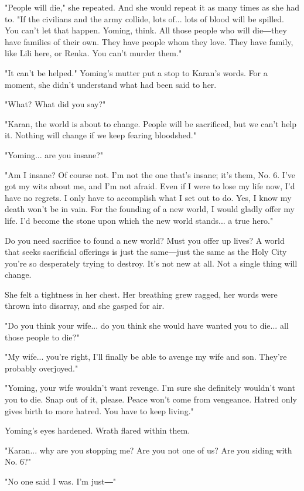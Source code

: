 "People will die," she repeated. And she would repeat it as many times
as she had to. "If the civilians and the army collide, lots of... lots
of blood will be spilled. You can't let that happen. Yoming, think. All
those people who will die―they have families of their own. They have
people whom they love. They have family, like Lili here, or Renka. You
can't murder them."

"It can't be helped." Yoming's mutter put a stop to Karan's words. For a
moment, she didn't understand what had been said to her.

"What? What did you say?"

"Karan, the world is about to change. People will be sacrificed, but we
can't help it. Nothing will change if we keep fearing bloodshed."

"Yoming... are you insane?"

"Am I insane? Of course not. I'm not the one that's insane; it's them,
No. 6. I've got my wits about me, and I'm not afraid. Even if I were to
lose my life now, I'd have no regrets. I only have to accomplish what I
set out to do. Yes, I know my death won't be in vain. For the founding
of a new world, I would gladly offer my life. I'd become the stone upon
which the new world stands... a true hero."

Do you need sacrifice to found a new world? Must you offer up lives? A
world that seeks sacrificial offerings is just the same―just the same as
the Holy City you're so desperately trying to destroy. It's not new at
all. Not a single thing will change.

She felt a tightness in her chest. Her breathing grew ragged, her words
were thrown into disarray, and she gasped for air.

"Do you think your wife... do you think she would have wanted you to
die... all those people to die?"

"My wife... you're right, I'll finally be able to avenge my wife and
son. They're probably overjoyed."

"Yoming, your wife wouldn't want revenge. I'm sure she definitely
wouldn't want you to die. Snap out of it, please. Peace won't come from
vengeance. Hatred only gives birth to more hatred. You have to keep
living."

Yoming's eyes hardened. Wrath flared within them.

"Karan... why are you stopping me? Are you not one of us? Are you siding
with No. 6?"

"No one said I was. I'm just―"

